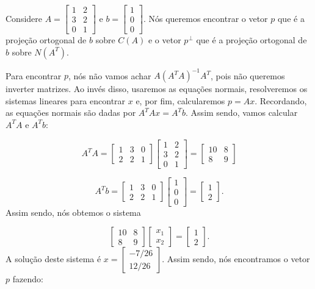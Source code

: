 \begin{Example}
	Considere $A = \begin{bmatrix}
		1 & 2 \\
		3 & 2 \\
		0 & 1
	\end{bmatrix}$ e $b = \begin{bmatrix}
		1 \\
		0 \\
		0
	\end{bmatrix}$. Nós queremos encontrar o vetor $p$ que é a projeção ortogonal de $b$ sobre $C(A)$ e o vetor $p^\perp$ que é a projeção ortogonal de $b$ sobre $N(A^T)$. 
	
	Para encontrar $p$, nós não vamos achar $A(A^TA)^{-1}A^T$, pois não queremos inverter matrizes. Ao invés disso, usaremos as equações normais, resolveremos os sistemas lineares para encontrar $x$ e, por fim, calcularemos $p = Ax$. Recordando, as equações normais são dadas por $A^TAx = A^Tb$. Assim sendo, vamos calcular $A^TA$ e $A^Tb$:
	
	$$
	A^TA = \begin{bmatrix}
		1 & 3 & 0 \\
		2 & 2 & 1
	\end{bmatrix}\begin{bmatrix}
		1 & 2 \\
		3 & 2 \\
		0 & 1
	\end{bmatrix} = \begin{bmatrix}
		10 & 8 \\
		8 & 9
	\end{bmatrix}
	$$
	
	$$
	A^Tb = \begin{bmatrix}
		1 & 3 & 0 \\
		2 & 2 & 1
	\end{bmatrix}\begin{bmatrix}
		1 \\
		0 \\
		0
	\end{bmatrix} = \begin{bmatrix}
		1 \\
		2
	\end{bmatrix}.
	$$
	Assim sendo, nós obtemos o sistema
	
	$$
	\begin{bmatrix}
		10 & 8 \\
		8 & 9
	\end{bmatrix}\begin{bmatrix}
		x_1 \\
		x_2
	\end{bmatrix} = \begin{bmatrix}
		1 \\
		2
	\end{bmatrix}.
	$$
	A solução deste sistema é $x = \begin{bmatrix}
		-7/26 \\
		12/26
	\end{bmatrix}$. Assim sendo, nós encontramos o vetor $p$ fazendo:
	

\end{Example}
